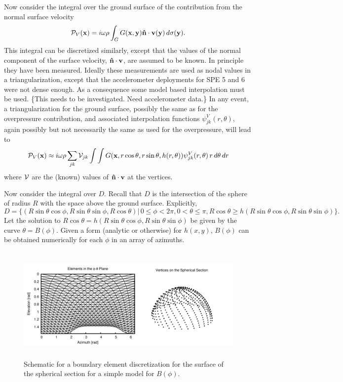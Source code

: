
\vspace*{5pt}

Now consider the integral over the ground surface of the contribution from the normal surface velocity
\[
{\cal P}_V({\bf x})=i\omega\rho \int_{G} G({\bf x},{\bf y}){\bf \hat n}\cdot{\bf v}({\bf y})\, d\sigma({\bf y}).
\]
This integral can be discretized similarly, except that the values of the normal component of the surface velocity, ${\bf \hat n}\cdot{\bf v}$, are assumed to be known. In principle they have been measured. Ideally these measurements are used as nodal values in a triangularization, except that the accelerometer deployments for SPE 5 and 6 were not dense enough. As a consequence some model based interpolation must be used. {\color{Blue} \{This needs to be investigated. Need accelerometer data.\}} In any event, a triangularization for the ground surface, possibly the same as for the overpressure contribution, and associated interpolation functions $\psi^{V}_{jk}(r,\theta)$, again possibly but not necessarily the same as used for the overpressure, will lead to 
\[
{\cal P}_V({\bf x})
\approx 
i\omega\rho \sum_{jk} {\cal V}_{jk}
\int\int G({\bf x},r\cos\theta,r\sin\theta,h(r,\theta))\psi^{V}_{jk}(r,\theta)\, r\, d\theta\, dr
\]
where ${\cal V}$ are the (known) values of ${\bf \hat n}\cdot{\bf v}$ at the vertices. 

\vspace*{10pt}


\vspace*{5pt}

Now consider the integral over $D$. Recall that $D$ is the intersection of the sphere of radius $R$ with the space above the ground surface. Explicitly, 
\[
D=
\{(R\sin\theta\cos\phi,R\sin\theta\sin\phi,R\cos\theta)
\big|
\, 0\le\phi<2\pi, 0<\theta\le\pi,
R\cos\theta\ge h(R\sin\theta\cos\phi,R\sin\theta\sin\phi)\}.
\]
Let the solution to $R\cos\theta = h(R\sin\theta\cos\phi,R\sin\theta\sin\phi)$ be given by the curve $\theta=B(\phi)$. Given a form (analytic or otherwise) for $h(x,y)$, $B(\phi)$ can be obtained numerically for each $\phi$ in an array of azimuths. 

\begin{figure}[h]
  \centering
  \includegraphics[height=160pt]{figures/sphere_section_elements.pdf}
  \caption{Schematic for a boundary element discretization for the surface of the spherical section for a simple model for $B(\phi)$.}
  \label{fig:spherical_section_elements}
\end{figure}


